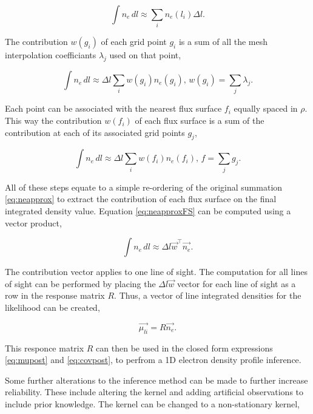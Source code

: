 \begin{equation}
  \int n_e \, dl \approx \sum_i n_e(l_i) \Delta l.
  \label{eq:neapprox}
\end{equation}

\noindent The contribution $w(g_i)$ of each grid point $g_i$ is a sum of all the mesh interpolation coefficiants $\lambda_j$ used on that point,

\begin{equation}
  \int n_e \, dl \approx \Delta l \sum_i w(g_i) n_e(g_i), \, w(g_i) = \sum_j \lambda_j.
\end{equation}

\noindent Each point can be associated with the nearest flux surface $f_i$ equally spaced in $\rho$. This way the contribution $w(f_i)$ of each flux surface is a sum of the contribution at each of its associated grid points $g_j$,

\begin{equation}
  \int n_e \, dl \approx \Delta l \sum_i w(f_i) n_e(f_i), \, f = \sum_j g_j.
  \label{eq:neapproxFS}
\end{equation}

\noindent All of these steps equate to a simple re-ordering of the original summation \ref{eq:neapprox} to extract the contribution of each flux surface on the final integrated density value. Equation \ref{eq:neapproxFS} can be computed using a vector product,

\begin{equation}
  \int n_e \, dl \approx \Delta l \vec{w}^{\top} \vec{n_e}.
\end{equation}

\noindent The contribution vector applies to one line of sight. The computation for all lines of sight can be performed by placing the $\Delta l \vec{w}$ vector for each line of sight as a row in the response matrix $R$. Thus, a vector of line integrated densities for the likelihood can be created,

\begin{equation}
  \vec{\mu_{li}} = R \vec{n_e}.
\end{equation}

\noindent This responce matrix $R$ can then be used in the closed form expressions \ref{eq:mupost} and \ref{eq:covpost}, to perfrom a 1D electron density profile inference.

Some further alterations to the inference method can be made to further increase reliability. These include altering the kernel and adding artificial observations to include prior knowledge. The kernel can be changed to a non-stationary kernel, 

